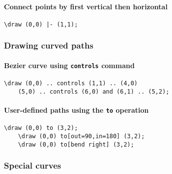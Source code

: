 \documentclass{article}
\begin{document}
\paragraph{Connect points by first vertical then horizontal}
\begin{Verbatim}[fontsize=\scriptsize]
    \draw (0,0) |- (1,1);
\end{Verbatim}

\subsubsection{Drawing curved paths}
\paragraph{Bezier curve using \texttt{controls} command}
\begin{Verbatim}[fontsize=\scriptsize]
    \draw (0,0) .. controls (1,1) .. (4,0)
    (5,0) .. controls (6,0) and (6,1) .. (5,2);
\end{Verbatim}

\paragraph{User-defined paths using the \texttt{to} operation}
\begin{Verbatim}[fontsize=\scriptsize]
    \draw (0,0) to (3,2);
    \draw (0,0) to[out=90,in=180] (3,2);
    \draw (0,0) to[bend right] (3,2);
\end{Verbatim}

\subsubsection{Special curves}
\end{document}

